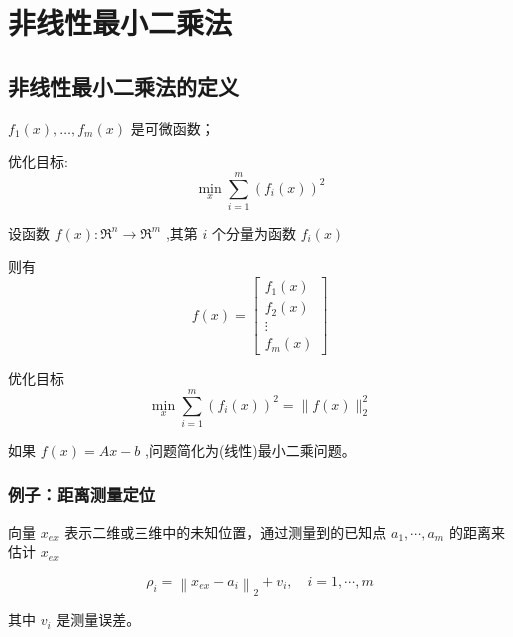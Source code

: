 \chapter{非线性最小二乘法}

\section{非线性最小二乘法的定义}

\begin{problem}
    $ f_{1}(x), \ldots, f_{m}(x) $ 是可微函数；

    优化目标: \begin{equation} \min _{x} \sum_{i=1}^{m}\left(f_{i}(x)\right)^{2} \end{equation}

\end{problem}

\begin{problem}
    \label{pbl:non-linear-least-squares}
    设函数 $ f(x): \mathfrak{R}^{n} \rightarrow \mathfrak{R}^{m} $ ,其第 $ i $ 个分量为函数 $ f_{i}(x)$

    则有
    \begin{equation}
    f(x)=\left[\begin{array}{c}
    f_{1}(x) \\
    f_{2}(x) \\
    \vdots \\
    f_{m}(x)
    \end{array}\right]
    \end{equation}

    优化目标
    \begin{equation} \min _{x} \sum_{i=1}^{m}\left(f_{i}(x)\right)^{2}=\|f(x)\|_{2}^{2} \end{equation}
\end{problem}


如果 $ f(x)=A x-b $ ,问题简化为(线性)最小二乘问题。

\subsection{例子：距离测量定位}

\begin{problem}
    向量 $ x_{e x} $ 表示二维或三维中的未知位置，通过测量到的已知点 $ a_{1}, \cdots, a_{m} $ 的距离来估计 $ x_{e x} $ 

    \begin{equation}
    \rho_{i}=\left\|x_{e x}-a_{i}\right\|_{2}+v_{i}, \quad i=1, \cdots, m
    \end{equation}

    其中 $ v_{i} $ 是测量误差。
\end{problem}


